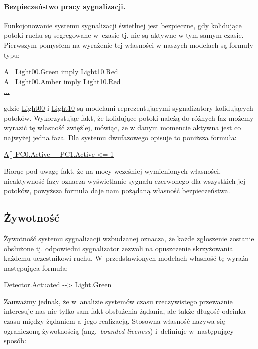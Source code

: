 \documentclass{pracamgr}
\newcommand{\ang}[1]{(ang.~\emph{#1})}
\newcommand{\ttt}[1]{\url{#1}}
\newcommand{\tttform}[1]{
  \begin{center}
    \ttt{#1}
  \end{center}
}
\theoremstyle{plain}
\begin{document}
\paragraph{Bezpieczeństwo pracy sygnalizacji.}
Funkcjonowanie systemu sygnalizacji świetlnej jest bezpieczne, gdy
kolidujące potoki ruchu są segregowane w~czasie tj. nie są aktywne w
tym samym czasie. Pierwszym pomysłem na wyrażenie tej własności w
naszych modelach są formuły typu:
\begin{center}
\ttt{A[] Light00.Green imply Light10.Red}\\
\ttt{A[] Light00.Amber imply Light10.Red}\\
\ttt{...}
\end{center}
gdzie \ttt{Light00} i \ttt{Light10} są modelami reprezentującymi
sygnalizatory kolidujących potoków. Wykorzystując fakt, że kolidujące
potoki należą do różnych faz możemy wyrazić tę własność zwięźlej,
mówiąc, że w danym momencie aktywna jest co najwyżej jedna faza. Dla
systemu dwufazowego opisuje to poniższa formuła:
\begin{center}
  \url{A[] PC0.Active + PC1.Active <= 1}
\end{center}
Biorąc pod uwagę fakt, że na mocy wcześniej wymienionych własności,
nieaktywność fazy oznacza wyświetlanie sygnału czerwonego dla
wszystkich jej potoków, powyższa formuła daje nam pożądaną własność
bezpieczeństwa.


\subsection{Żywotność}
\label{s:properties:liveness}

Żywotność systemu sygnalizacji wzbudzanej oznacza, że każde zgłoszenie
zostanie obsłużone tj. odpowiedni sygnalizator zezwoli na opuszczenie
skrzyżowania każdemu uczestnikowi ruchu. W~przedstawionych modelach
własność tę wyraża następująca formuła:
\tttform{Detector.Actuated --> Light.Green}
Zauważmy jednak, że w~analizie systemów czasu rzeczywistego przeważnie
interesuje nas nie tylko sam fakt obsłużenia żądania, ale także
długość odcinka czasu między żądaniem a~jego realizacją. Stosowna
własność nazywa się ograniczoną żywotnością \ang{bounded liveness}
i~definiuje w~następujący sposób:
\end{document}
